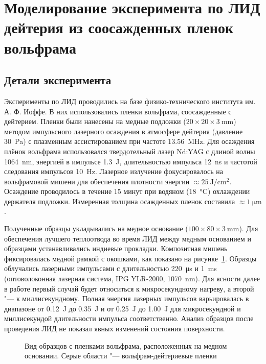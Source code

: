 \section{Моделирование эксперимента по ЛИД дейтерия из соосажденных пленок вольфрама}\label{sec:ch4/sec1}

\subsection{Детали эксперимента}\label{subsec:ch4/sec1/subsec1}

Эксперименты по ЛИД проводились на базе физико-технического института им. А. Ф. Иоффе. В них использовались пленки вольфрама, соосажденные с дейтерием. Пленки были нанесены на медные подложки ($20 \times 20 \times \SI{3}{\milli\metre}$) методом импульсного лазерного осаждения в атмосфере дейтерия (давление \SI{30}{\pascal}) с плазменным ассистированием при частоте \SI{13.56}{\mega\hertz}. Для осаждения плёнок вольфрама использовался твердотельный лазер Nd:YAG с длиной волны \SI{1064}{\nano\meter}, энергией в импульсе \SI{1.3}{\joule}, длительностью импульса \SI{12}{\nano\second} и частотой следования импульсов \SI{10}{\hertz}. Лазерное излучение фокусировалось на вольфрамовой мишени для обеспечения плотности энергии $\approx\SI{25}{\joule\per\centi\meter\squared}$. Осаждение проводилось в течение 15 минут при водяном (\SI{18}{\degreeCelsius}) охлаждении держателя подложки. Измеренная толщина осажденных пленок составила $\approx\SI{1}{\micro\metre}$.

Полученные образцы укладывались на медное основание ($100 \times 80 \times \SI{3}{\milli\metre}$). Для обеспечения лучшего теплоотвода во время ЛИД между медным основанием и образцами устанавливались индиевые прокладки. Композитная мишень фиксировалась медной рамкой с окошками, как показано на рисунке~\cref{fig:ch4/LID_target}. Образцы облучались лазерными импульсами с длительностью \SI{220}{\micro\second} и \SI{1}{\milli\second} (оптоволоконная лазерная система, IPG YLR-2000, \SI{1070}{\nano\metre}). Для ясности далее в работе первый случай будет относиться к микросекундному нагреву, а второй "--- к миллисекундному. Полная энергия лазерных импульсов варьировалась в диапазоне от \SI{0.12}{\joule} до \SI{0.35}{\joule} и от \SI{0.25}{\joule} до \SI{1.00}{\joule} для микросекундной и миллисекундой длительности импульса соответственно. Анализ образцов после проведения ЛИД не показал явных изменений состояния поверхности.

\begin{figure}[ht]
    \caption{Вид образцов с пленками вольфрама, расположенных на медном основании. Серые области "--- вольфрам-дейтериевые пленки}\label{fig:ch4/LID_target}
\end{figure}

